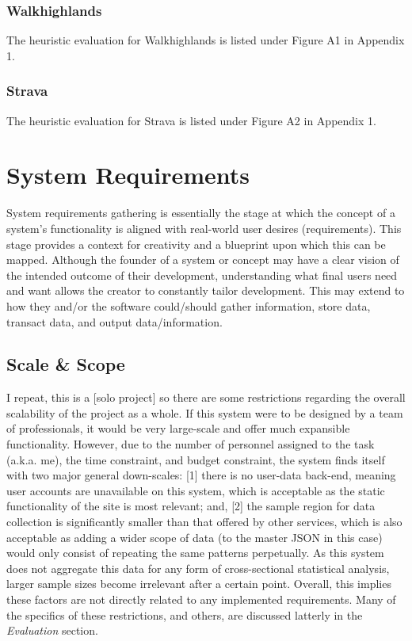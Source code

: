 \documentclass[11pt, english]{article}
\begin{document}
		\subsubsection{Walkhighlands}

	The heuristic evaluation for Walkhighlands is listed under Figure A1 in Appendix 1.

		\subsubsection{Strava}

	The heuristic evaluation for Strava is listed under Figure A2 in Appendix 1.

\newpage

\section{System Requirements}\label{ch3}

	System requirements gathering is essentially the stage at which the concept of a system's functionality is aligned with real-world user desires (requirements). This stage provides a context for creativity and a blueprint upon which this can be mapped. Although the founder of a system or concept may have a clear vision of the intended outcome of their development, understanding what final users need and want allows the creator to constantly tailor development. This may extend to how they and/or the software could/should gather information, store data, transact data, and output data/information.

	\subsection{Scale \& Scope}

	I repeat, this is a [solo project] so there are some restrictions regarding the overall scalability of the project as a whole. If this system were to be designed by a team of professionals, it would be very large-scale and offer much expansible functionality. However, due to the number of personnel assigned to the task (a.k.a. me), the time constraint, and budget constraint, the system finds itself with two major general down-scales: [1] there is no user-data back-end, meaning user accounts are unavailable on this system, which is acceptable as the static functionality of the site is most relevant; and, [2] the sample region for data collection is significantly smaller than that offered by other services, which is also acceptable as adding a wider scope of data (to the master JSON in this case) would only consist of repeating the same patterns perpetually. As this system does not aggregate this data for any form of cross-sectional statistical analysis, larger sample sizes become irrelevant after a certain point. Overall, this implies these factors are not directly related to any implemented requirements. Many of the specifics of these restrictions, and others, are discussed latterly in the \textit{Evaluation} section.\\
\end{document}
